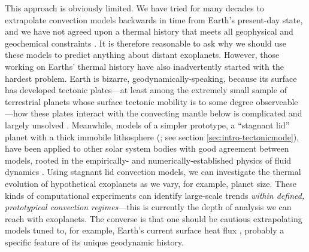 This approach is obviously limited. We have tried for many decades to extrapolate convection models backwards in time from Earth's present-day state, and we have not agreed upon a thermal history that meets all geophysical and geochemical constraints \citep[and references therein]{korenaga_urey_2008}. It is therefore reasonable to ask why we should use these models to predict anything about distant exoplanets. However, those working on Earths' thermal history have also inadvertently started with the hardest problem. Earth is bizarre, geodynamically-speaking, because its surface has developed tectonic plates---at least among the extremely small sample of terrestrial planets whose surface tectonic mobility is to some degree observeable \citep{stern_stagnant_2018}---how these plates interact with the convecting mantle below is complicated and largely unsolved \citep[see][]{lenardic_internal_2022}. Meanwhile,  models of a simpler prototype, a ``stagnant lid'' planet with a thick immobile lithosphere %
(\citealt{davaille_transient_1993, moresi_numerical_1995}; see section \ref{sec:intro-tectonicmode}), have been applied to other solar system bodies with good agreement between models, rooted in the empirically- and numerically-established physics of fluid dynamics \citep[e.g.,][]{plesa_thermal_2015, thiriet_scaling_2019}. Using stagnant lid convection models, we can investigate the thermal evolution of hypothetical exoplanets as we vary, for example, planet size. These kinds of computational experiments can identify large-scale trends \textit{within defined, prototypical convection regimes}---this is currently the depth of analysis we can reach with exoplanets. The converse is that one should be cautious extrapolating models tuned to, for example, Earth's current surface heat flux \citep[e.g.,][]{schubert_whole_1980}, probably a specific feature of its unique geodynamic history.


